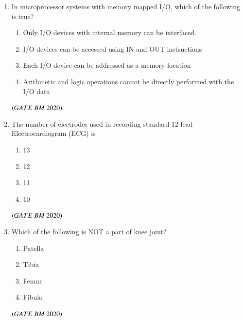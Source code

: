 \documentclass[journal,12pt,onecolumn]{IEEEtran}
\theoremstyle{remark}
\begin{document}
\begin{enumerate}
\item In microprocessor systems with memory mapped I/O, which of the following is true?
\begin{enumerate}[label=\alph*)] 
\item\hspace{0.5cm}Only I/O devices with internal memory can be interfaced.
\item\hspace{0.5cm}I/O devices can be accessed using IN and OUT instructions
\item\hspace{0.5cm}Each I/O device can be addressed as a memory location
\item\hspace{0.5cm}Arithmetic and logic operations cannot be directly performed with the I/O data
\end{enumerate}
 \hfill $\left(GATE\ BM\ 2020\right)$\\
 
\item The number of electrodes used in recording standard 12-lead Electrocardiogram (ECG) is
\begin{enumerate}[label=\alph*)] 
\item\hspace{0.5cm}13
\item\hspace{0.5cm}12
\item\hspace{0.5cm}11
\item\hspace{0.5cm}10
\end{enumerate}
 \hfill $\left(GATE\ BM\ 2020\right)$\\
 
\item Which of the following is NOT a part of knee joint?
\begin{enumerate}[label=\alph*)] 
\item\hspace{0.5cm}Patella
\item\hspace{0.5cm}Tibia
\item\hspace{0.5cm}Femur
\item\hspace{0.5cm}Fibula
\end{enumerate}
 \hfill $\left(GATE\ BM\ 2020\right)$\\
 

\end{enumerate}
\end{document}
